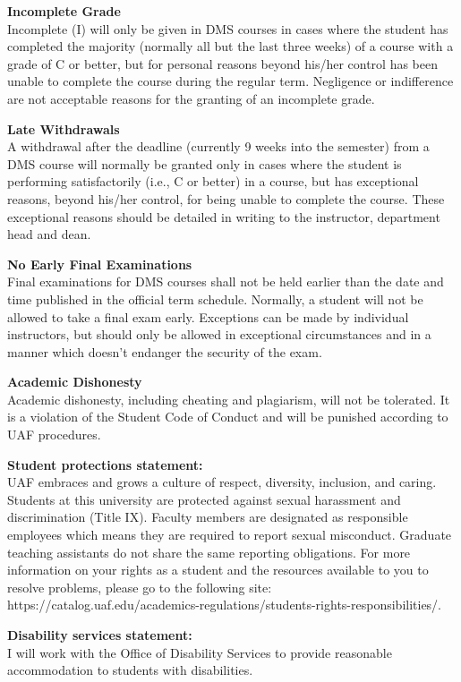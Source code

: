 \documentclass[12pt]{article}
\renewcommand{\emph}[1]{\textsf{\textbf{#1}}}
\newcommand{\localhead}[1]{\par\smallskip\textbf{#1}\nobreak\\}%
\def\subheading#1{\localhead{\emph{#1}}}
\begin{document}
\subheading{Incomplete Grade} 
Incomplete (I) will only be given in
  DMS courses in cases where
  the student has completed the majority (normally all but the last
  three weeks) of a course with a grade of C or better, but for
  personal reasons beyond his/her control has been unable to complete
  the course during the regular term. Negligence or indifference are
  not acceptable reasons for the granting of an incomplete
  grade. 

\subheading{Late Withdrawals} 
A withdrawal after the deadline
  (currently 9 weeks into the semester) from a DMS course will
  normally be granted only in cases where the student is performing
  satisfactorily (i.e., C or better) in a course, but has exceptional
  reasons, beyond his/her control, for being unable to complete the
  course. These exceptional reasons should be detailed in writing to
  the instructor, department head and dean.

\subheading{No Early Final Examinations}
Final examinations for DMS
  courses shall not be held earlier than the date and time published
  in the official term schedule. Normally, a student will not be
  allowed to take a final exam early. Exceptions can be made by
  individual instructors, but should only be allowed in exceptional
  circumstances and in a manner which doesn't endanger the security of
  the exam.

\subheading{Academic Dishonesty}
Academic dishonesty, including cheating and plagiarism, will not
be tolerated.  It is a violation of the Student Code of Conduct
and will be punished according to UAF procedures.

 
\subheading{Student protections statement:} UAF embraces and grows a culture of respect, diversity, inclusion, and caring. Students at this university are protected against sexual harassment and discrimination (Title IX). Faculty members are designated as responsible employees which means they are required to report sexual misconduct. Graduate teaching assistants do not share the same reporting obligations. For more information on your rights as a student and the resources available to you to resolve problems, please go to the following site: https://catalog.uaf.edu/academics-regulations/students-rights-responsibilities/.

\subheading{Disability services statement:} I will work with the Office of Disability Services to provide reasonable accommodation to students with disabilities.
\end{document}
